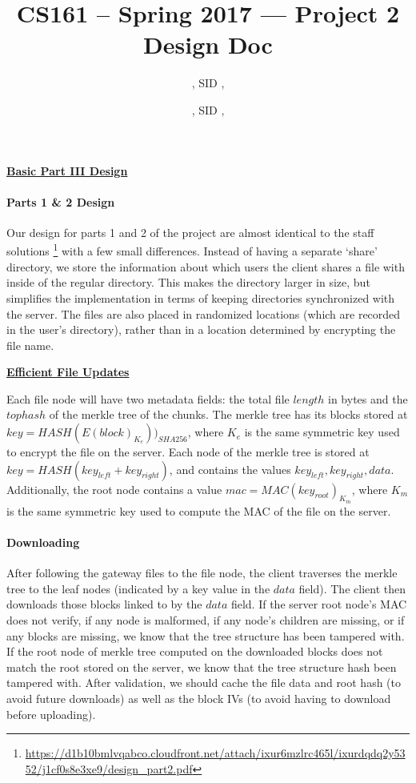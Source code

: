 \documentclass[12pt]{exam}
\title{CS161 -- Spring 2017 --- Project 2 Design Doc}
\author{
\Name, SID \SID, \texttt{\Login}
\and
\SecondName, SID \SecondSID, \texttt{\SecondLogin}
}
\date{}
\begin{document}
\maketitle

\large
\begin{center} \underline{\textbf{Basic Part III Design}} \end{center}

\normalsize
\paragraph{Parts 1 \& 2 Design} Our design for parts 1 and 2 of the project are almost identical to the staff solutions \footnote{\url{https://d1b10bmlvqabco.cloudfront.net/attach/ixur6mzlrc465l/ixurdqdq2y5352/j1cf0s8e3xe9/design_part2.pdf}} with a few small differences. Instead of having a separate `share' directory, we store the information about which users the client shares a file with inside of the regular directory. This makes the directory larger in size, but simplifies the implementation in terms of keeping directories synchronized with the server. The files are also placed in randomized locations (which are recorded in the user's directory), rather than in a location determined by encrypting the file name.

\large
\begin{center} \underline{\textbf{Efficient File Updates}} \end{center}
\normalsize Each file node will have two metadata fields: the total file $length$ in bytes and the $tophash$ of the merkle tree of the chunks. The merkle tree has its blocks stored at\\ $key = HASH(E(block)_{K_e}))_{SHA256}$, where $K_e$ is the same symmetric key used to encrypt the file on the server. Each node of the merkle tree is stored at $key = HASH(key_{left} + key_{right})$, and contains the values $key_{left}, key_{right}, data$. Additionally, the root node contains a value $mac = MAC(key_{root})_{K_m}$, where $K_m$ is the same symmetric key used to compute the MAC of the file on the server.

\paragraph{Downloading}
After following the gateway files to the file node, the client traverses the merkle tree to the leaf nodes (indicated by a key value in the $data$ field). The client then downloads those blocks linked to by the $data$ field. If the server root node's MAC does not verify, if any node is malformed, if any node's children are missing, or if any blocks are missing, we know that the tree structure has been tampered with. If the root node of merkle tree computed on the downloaded blocks does not match the root stored on the server, we know that the tree structure hash been tampered with. After validation, we should cache the file data and root hash (to avoid future downloads) as well as the block IVs (to avoid having to download before uploading).
\end{document}
